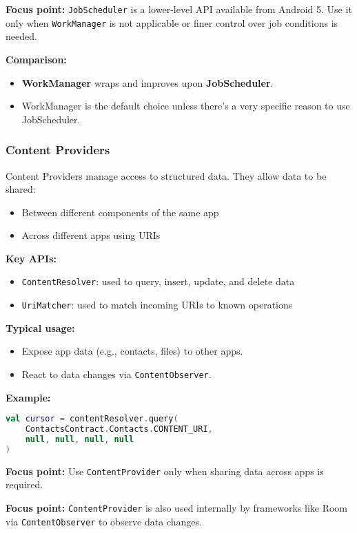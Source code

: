 \documentclass[a4paper,12pt]{article}
\begin{document}
\textbf{Focus point:} \texttt{JobScheduler} is a lower-level API available from Android 5. Use it only when \texttt{WorkManager} is not applicable or finer control over job conditions is needed.

\textbf{Comparison:}
\begin{itemize}
  \item \textbf{WorkManager} wraps and improves upon \textbf{JobScheduler}.
  \item WorkManager is the default choice unless there's a very specific reason to use JobScheduler.
\end{itemize}

\subsubsection{Content Providers}

Content Providers manage access to structured data. They allow data to be shared:
\begin{itemize}
  \item Between different components of the same app
  \item Across different apps using URIs
\end{itemize}

\textbf{Key APIs:}
\begin{itemize}
  \item \texttt{ContentResolver}: used to query, insert, update, and delete data
  \item \texttt{UriMatcher}: used to match incoming URIs to known operations
\end{itemize}

\textbf{Typical usage:}
\begin{itemize}
  \item Expose app data (e.g., contacts, files) to other apps.
  \item React to data changes via \texttt{ContentObserver}.
\end{itemize}

\textbf{Example:}
\begin{lstlisting}[language=Kotlin]
val cursor = contentResolver.query(
    ContactsContract.Contacts.CONTENT_URI,
    null, null, null, null
)
\end{lstlisting}

\textbf{Focus point:} Use \texttt{ContentProvider} only when sharing data across apps is required.

\textbf{Focus point:} \texttt{ContentProvider} is also used internally by frameworks like Room via \texttt{ContentObserver} to observe data changes.
\end{document}
